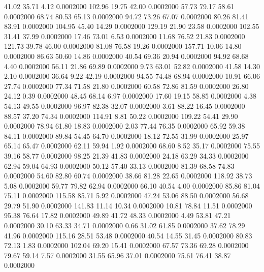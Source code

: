   41.02   35.71    4.12   0.0002000
 102.96   19.75   42.00   0.0002000
  57.73   79.17   58.61   0.0002000
  68.74   80.53   65.13   0.0002000
  94.72   73.26   67.07   0.0002000
  80.26   81.41   83.91   0.0002000
 104.95   45.40   14.29   0.0002000
 129.19   21.90   23.58   0.0002000
 102.55   31.41   37.99   0.0002000
  17.46   73.01    6.53   0.0002000
  11.68   76.52   21.83   0.0002000
 121.73   39.78   46.00   0.0002000
  81.08   76.58   19.26   0.0002000
 157.71   10.06   14.80   0.0002000
  86.63   50.60   14.86   0.0002000
  40.54   69.36   20.94   0.0002000
  94.92   68.68    4.40   0.0002000
  56.11   21.86   69.89   0.0002000
   9.73   63.01   52.82   0.0002000
  41.58   14.30    2.10   0.0002000
  36.64    9.22   42.19   0.0002000
  94.55   74.48   68.94   0.0002000
  10.91   66.06   27.74   0.0002000
  77.34   71.58   21.80   0.0002000
  60.58   72.86   81.59   0.0002000
  26.80   24.12    0.39   0.0002000
  48.45   68.14    6.97   0.0002000
  17.60   19.15   58.85   0.0002000
   4.38   54.13   49.55   0.0002000
  96.97   82.38   32.07   0.0002000
   3.61   88.22   16.45   0.0002000
  88.57   37.20   74.34   0.0002000
 114.91    8.81   50.22   0.0002000
 109.22   54.41   29.90   0.0002000
  78.94   61.80   18.83   0.0002000
   2.03   77.44   76.35   0.0002000
  65.92   59.38   84.11   0.0002000
  89.84   54.45   64.70   0.0002000
  18.12   72.55   31.99   0.0002000
  25.97   65.14   65.47   0.0002000
  62.11   59.94    1.92   0.0002000
  68.60    8.52   35.17   0.0002000
  75.55   39.16   58.77   0.0002000
  98.25   21.39   41.83   0.0002000
  24.18   63.29   34.33   0.0002000
  62.94   59.04   64.93   0.0002000
  50.12   57.40   33.13   0.0002000
  81.39   68.58   74.83   0.0002000
  54.60   82.80   60.74   0.0002000
  38.66   81.28   22.65   0.0002000
 118.92   38.73    5.08   0.0002000
  59.77   79.82   62.94   0.0002000
  66.10   40.54    4.00   0.0002000
  85.86   81.04   75.11   0.0002000
 115.58   85.71    5.92   0.0002000
  47.24   53.06   88.50   0.0002000
  56.68   29.79   51.90   0.0002000
 141.83   11.14   10.34   0.0002000
  10.81   78.84   11.51   0.0002000
  95.38   76.64   17.82   0.0002000
  49.89   41.72   48.33   0.0002000
   4.49   53.81   47.21   0.0002000
  30.10   63.33   34.71   0.0002000
   0.66   31.02   61.85   0.0002000
  37.62   78.29   41.96   0.0002000
 115.16   28.51   53.48   0.0002000
  40.54   14.55   31.45   0.0002000
  80.83   72.13    1.83   0.0002000
 102.04   69.20   15.41   0.0002000
  67.57   73.36   69.28   0.0002000
  79.67   59.14    7.57   0.0002000
  31.55   65.96   37.01   0.0002000
  75.61   76.41   38.87   0.0002000

